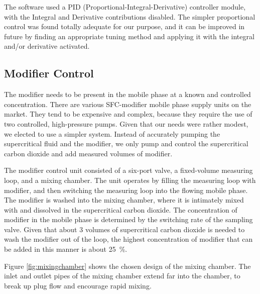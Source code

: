 The software used a PID (Proportional-Integral-Derivative) controller module,
with the Integral and Derivative contributions disabled. The simpler
proportional control was found totally adequate for our purpose, and it can be
improved in future by finding an appropriate tuning method and applying it with
the integral and/or derivative activated.



\subsection{Modifier Control}

The modifier needs to be present in the mobile phase at a known and controlled
concentration. There are various SFC-modifier mobile phase supply units on the
market. They tend to be expensive and complex, because they require the use of
two controlled, high-pressure pumps. Given that our needs were rather modest, we
elected to use a simpler system. Instead of accurately pumping the supercritical
fluid and the modifier, we only pump and control the supercritical carbon
dioxide and add measured volumes of modifier.

The modifier control unit consisted of a six-port valve, a fixed-volume
measuring loop, and a mixing chamber. The unit operates by filling the measuring
loop with modifier, and then switching the measuring loop into the flowing
mobile phase. The modifier is washed into the mixing chamber, where it is
intimately mixed with and dissolved in the supercritical carbon dioxide. The
concentration of modifier in the mobile phase is determined by the switching
rate of the sampling valve. Given that about 3 volumes of supercritical carbon
dioxide is needed to wash the modifier out of the loop, the highest
concentration of modifier that can be added in this manner is about
\SI{25}{\percent}.

Figure \ref{fig:mixingchamber} shows the chosen design of the mixing chamber.
The inlet and outlet pipes of the mixing chamber extend far into the chamber, to
break up plug flow and encourage rapid mixing.  

